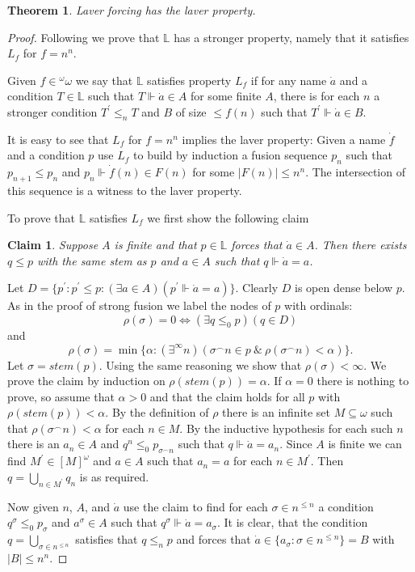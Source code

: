 \documentclass[a4paper,11pt,oneside]{mybook}
\def\force{\Vdash}
\def\conc{{^\smallfrown}}
\theoremstyle{theorem}
\newtheorem{theorem}[subsection]{Theorem}
\newtheorem{claim}[subsection]{Claim}
\theoremstyle{example}
\begin{document}
\begin{theorem} Laver forcing has the laver property.
\end{theorem}
\begin{proof} Following \cite{bartoszynski-judah} we prove that $\mathbb{L}$ has a stronger property, namely that it satisfies $L_f$ for $f=n^n$.

Given $f\in{}^\omega\omega$ we say that $\mathbb{L}$ satisfies property $L_f$ if for any name $\dot{a}$ and a condition $T\in\mathbb{L}$ such
that $T\force\dot{a}\in A$ for some finite $A$, there is for each $n$ a stronger condition $T^\prime\leq_n T$ and $B$ of size $\leq f(n)$ such that $T^\prime\force \dot{a}\in B$.

It is easy to see that $L_f$ for $f=n^n$ implies the laver property: Given a name $\dot{f}$ and a condition $p$ use $L_f$ to build by induction a fusion
sequence $p_n$ such that $p_{n+1}\leq p_n$ and $p_n\force \dot{f}(n)\in F(n)$ for some $|F(n)|\leq n^n$. The intersection of this sequence is a witness to the
laver property.

To prove that $\mathbb{L}$ satisfies $L_f$ we first show the following claim

\begin{claim} Suppose $A$ is finite and that $p\in\mathbb{L}$ forces that $\dot{a}\in A$. Then there exists $q\leq p$ with the same stem as $p$ and $a\in A$ such
 that $q\force\dot{a}=a$.
\end{claim}
Let $D=\{p^\prime:p^\prime\leq p:(\exists a\in A)(p^\prime\force\dot{a}=a)\}$. Clearly $D$ is open dense below $p$. As in the proof of strong fusion we label the
nodes of $p$ with ordinals:
$$
\rho(\sigma)=0\iff(\exists q\leq_0 p)(q\in D)
$$
and
$$
\rho(\sigma)=\min\{\alpha:(\exists^{\infty} n)(\sigma\conc n\in p\ \&\ \rho(\sigma\conc n)<\alpha)\}.
$$
Let $\sigma=stem(p)$. Using the same reasoning we show that $\rho(\sigma)<\infty$. We prove the claim by induction on $\rho(stem(p))=\alpha$. If $\alpha=0$ there is nothing to prove, so assume that $\alpha>0$ and that the claim holds for all $p$ with $\rho(stem(p))<\alpha$. By the definition of $\rho$ there is an infinite set $M\subseteq\omega$ such that $\rho(\sigma\conc n)<\alpha$ for each $n\in M$. By the inductive hypothesis for each such $n$ there is an $a_n\in A$ and $q^n\leq_0 p_{\sigma\conc n}$ such that $q\force\dot{a}= a_n$. Since $A$ is finite we can find $M^\prime\in[M]^\omega$ and $a\in A$ such that $a_n=a$ for each $n\in M^\prime$.
Then $q=\bigcup_{n\in M^\prime} q_n$ is as required.

Now given $n$, $A$, and $\dot{a}$ use the claim to find for each $\sigma\in n^{\leq n}$ a condition $q^\sigma\leq_0 p_\sigma$ and $a^\sigma\in A$ such that $q^\sigma\force \dot{a}=a_\sigma$. It is clear, that the condition $q=\bigcup_{\sigma\in n^{\leq n}}$ satisfies that $q\leq_n p$ and forces that
$\dot{a}\in\{a_\sigma:\sigma\in n^{\leq n}\}=B$ with $|B|\leq n^n$.
\end{proof}
\end{document}
